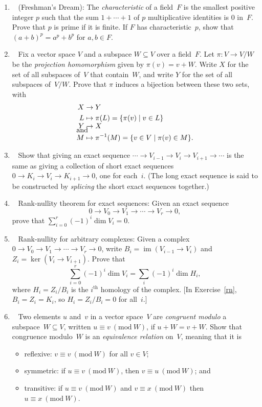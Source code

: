 \documentclass[11pt]{article}
\newcommand\score[1]{\marginpar{\vspace{-2ex}\color{blue}{#1/3}}\hspace{-1ex}}
\newcommand\0{\mathbf{0}}
\newcommand\<{\langle}
\renewcommand\>{\rangle}
\renewcommand\mod[1]{\ (\mathrm{mod}\ #1)}
\DeclareMathOperator\im{im}
\begin{document}
\begin{enumerate}
\item\ \score{}%
(Freshman's Dream): The \emph{characteristic} of a field~$F$ is the
smallest positive integer $p$ such that the sum $1 + \cdots + 1$ of
$p$ multiplicative identities is $0$ in~$F$.  Prove that $p$ is prime
if it is finite.  If $F$ has characteristic~$p$, show that $(a + b)^p
= a^p + b^p$ for $a,b \in F$.

\item\ \score{}%
Fix a vector space $V$ and a subspace $W \subseteq V$ over a
field~$F$.  Let $\pi: V \to V/W$ be the \emph{projection homomorphism}
given by $\pi(v) = v + W$.  Write $X$ for the set of all subspaces
of~$V$ that contain~$W$, and write $Y$ for the set of all subspaces
of~$V/W$.  Prove that $\pi$ induces a bijection between these two
sets, with
\begin{align*}
X &\to Y
\\
L &\mapsto \pi(L) = \{\pi(v) \mid v \in L\}\\
\intertext{and}\\[-8.75ex]
Y &\to X
\\
M &\mapsto \pi^{-1}(M) = \{v \in V \mid \pi(v) \in M\}.
\end{align*}

\item\ \score{}%
Show that giving an exact sequence $\cdots \to V_{i-1} \to V_i \to
V_{i+1} \to \cdots$ is the same as giving a collection of short exact
sequences $0 \to K_i \to V_i \to K_{i+1} \to 0$, one for each~$i$.
(The long exact sequence is said to be constructed by \emph{splicing}
the short exact sequences together.)

\item\ \score{}\label{rn}%
Rank-nullity theorem for exact sequences: Given an exact sequence
$$%
  0 \to V_0 \to V_1 \to \cdots \to V_r \to 0,
$$%
prove that $\sum_{i=0}^r (-1)^i \dim V_i = 0$.

\item\ \score{}%
Rank-nullity for arbitrary complexes: Given a complex $0 \to V_0 \to
V_1 \to \cdots \to V_r \to 0$, write $B_i = \im(V_{i-1} \to V_i)$ and
$Z_i = \ker(V_i \to V_{i+1})$.  Prove that
$$%
  \sum_{i=0}^r (-1)^i \dim V_i = \sum_i (-1)^i \dim H_i,
$$%
where $H_i = Z_i/B_i$ is the $i^\text{th}$ homology of the complex.
[In Exercise~\ref{rn}, $B_i = Z_i = K_i$, so $H_i = Z_i/B_i = 0$ for
all~$i$.]

\item\ \score{}%
Two elements $u$ and~$v$ in a vector space~$V$ are \emph{congruent
modulo} a subspace~$W \subseteq V$, written $u \equiv v \mod W$, if $u
+ W = v + W$.  Show that congruence modulo~$W$ is an \emph{equivalence
relation} on~$V$, meaning that it is
\begin{itemize}
\item
reflexive: $v \equiv v \mod W$ for all $v \in V$;
\item
symmetric: if $u \equiv v \mod W$, then $v \equiv u \mod W$; and
\item
transitive: if $u \equiv v \mod W$ and $v \equiv x \mod W$ then $u
\equiv x \mod W$.
\end{itemize}


\end{enumerate}
\end{document}
